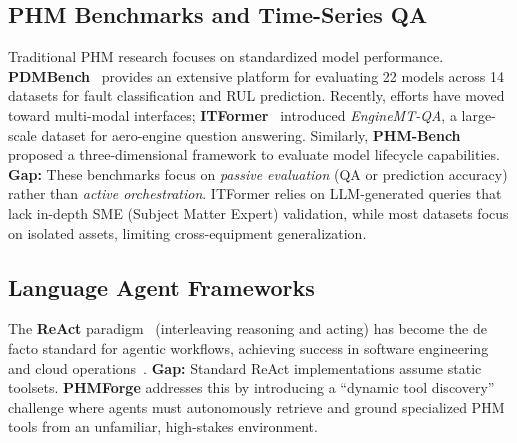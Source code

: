 \documentclass[sigconf,review]{acmart}
\begin{document}
\subsection{PHM Benchmarks and Time-Series QA}
Traditional PHM research focuses on standardized model performance. \textbf{PDMBench}~\cite{anonymous2026pdmbench} provides an extensive platform for evaluating 22 models across 14 datasets for fault classification and RUL prediction. Recently, efforts have moved toward multi-modal interfaces; \textbf{ITFormer}~\cite{wang2025itformer} introduced \textit{EngineMT-QA}, a large-scale dataset for aero-engine question answering. Similarly, \textbf{PHM-Bench}~\cite{yang2025phmbenchdomainspecificbenchmarkingframework} proposed a three-dimensional framework to evaluate model lifecycle capabilities.
\textbf{Gap:} These benchmarks focus on \textit{passive evaluation} (QA or prediction accuracy) rather than \textit{active orchestration}. ITFormer relies on LLM-generated queries that lack in-depth SME (Subject Matter Expert) validation, while most datasets focus on isolated assets, limiting cross-equipment generalization.

\subsection{Language Agent Frameworks}
The \textbf{ReAct} paradigm~\cite{yao2023reactsynergizingreasoningacting} (interleaving reasoning and acting) has become the de facto standard for agentic workflows, achieving success in software engineering~\cite{yang2024sweagentagentcomputerinterfacesenable} and cloud operations~\cite{shetty2024buildingaiagentsautonomous}. 
\textbf{Gap:} Standard ReAct implementations assume static toolsets. \textbf{PHMForge} addresses this by introducing a ``dynamic tool discovery'' challenge where agents must autonomously retrieve and ground specialized PHM tools from an unfamiliar, high-stakes environment.
\end{document}
